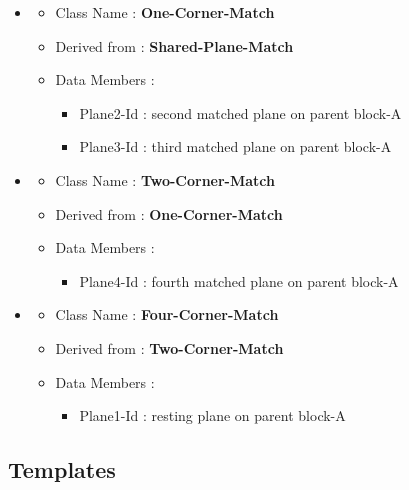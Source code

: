 \begin{itemize}
    \item

        \begin{itemize}
        \item   Class Name :	{\bf One-Corner-Match}
        \item   Derived from :	{\bf Shared-Plane-Match}
        \item   Data Members :
                    \begin{itemize}
					\item	Plane2-Id : second matched plane on parent block-A
					\item	Plane3-Id : third matched plane on parent block-A
                    \end{itemize}
        \end{itemize}

    \item

        \begin{itemize}
        \item   Class Name :    {\bf Two-Corner-Match}
        \item   Derived from :  {\bf One-Corner-Match}
        \item   Data Members :
                    \begin{itemize}
                    \item   Plane4-Id : fourth matched plane on parent block-A
                    \end{itemize}
        \end{itemize}

    \item

        \begin{itemize}
        \item   Class Name :    {\bf Four-Corner-Match}
        \item   Derived from :  {\bf Two-Corner-Match}
        \item   Data Members :
                    \begin{itemize}
                    \item   Plane1-Id : resting plane on parent block-A
                    \end{itemize}
        \end{itemize}


	\end{itemize}


	\subsection{Templates}

